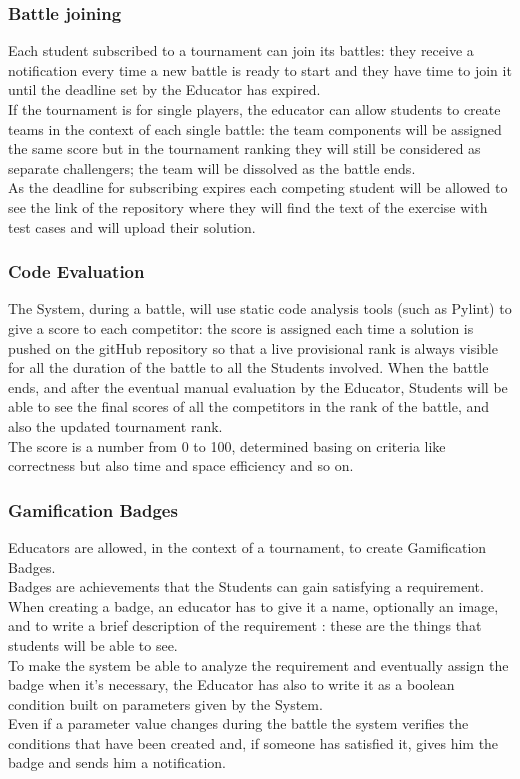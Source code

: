 \documentclass{article}
\begin{document}
\subsubsection{Battle joining}
Each student subscribed to a tournament can join its battles: they receive a notification every time a new battle is ready to start and they have time to join it until the deadline set by the Educator has expired.\\
If the tournament is for single players, the educator can allow students to create teams in the context of each single battle: the team components will be assigned the same score but in the tournament ranking they will still be considered as separate challengers; the team will be dissolved as the battle ends.\\
As the deadline for subscribing expires each competing student will be allowed to see the link of the repository where they will find the text of the exercise with test cases and will upload their solution.
\newpage
\subsubsection{Code Evaluation}
The System, during a battle, will use static code analysis tools (such as Pylint) to give a score to each competitor: the score is assigned each time a solution is pushed on the gitHub repository so that a live provisional rank is always visible for all the duration of the battle to all the Students involved. 
When the battle ends, and after the eventual manual evaluation by the Educator, Students will be able to see the final scores of all the competitors in the rank of the battle, and also the updated tournament rank.\\
The score is a number from 0 to 100, determined basing on criteria like correctness but also time and space efficiency and so on.
\subsubsection{Gamification Badges}
Educators are allowed, in the context of a tournament, to create Gamification Badges.\\
Badges are achievements that the Students can gain satisfying a requirement.\\
When creating a badge, an educator has to give it a name, optionally an image, and to write a brief description of the requirement : these are the things that students will be able to see.\\
To make the system be able to analyze the requirement and eventually assign the badge when it's necessary, the Educator has also to write it as a boolean condition built on parameters given by the System.\\
Even if a parameter value changes during the battle the system verifies the conditions that have been created and, if someone has satisfied it, gives him the badge and sends him a notification.\\
\end{document}
